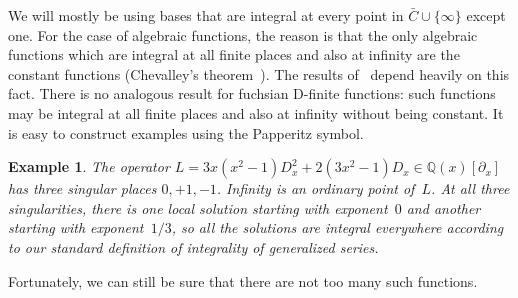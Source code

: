 \documentclass[final,1p,times,authoryear]{elsarticle}
\newtheorem{example}[theorem]{Example}
\let\set\mathbb
\begin{document}
We will mostly be using bases that are integral at every point in $\bar C\cup\{\infty\}$ except one.
For the case of algebraic functions, the reason is that the only algebraic functions which are
integral at all finite places and also at infinity are the constant functions (Chevalley's
theorem~\citep[p.~9, Cor.~3]{Chevalley1951}). The results of~\cite{chen16}
depend heavily on this fact. There is no analogous result for fuchsian D-finite functions: such
functions may be integral at all finite places and also at infinity without being constant.
It is easy to construct examples using the Papperitz symbol.

\begin{example}\label{example:integral-everywhere}
  The operator $L = 3 x(x^2-1) D_x^2 + 2 (3x^2 - 1) D_x\in\set Q(x)[\partial_x]$
  has three singular places $0,+1,-1$. Infinity is an ordinary point of~$L$.
  At all three singularities, there is one local solution starting with exponent~$0$
  and another starting with exponent~$1/3$, so all the solutions are integral
  everywhere according to our standard definition of integrality of generalized
  series.
\end{example}

Fortunately, we can still be sure that there are not too many such functions.
\end{document}
